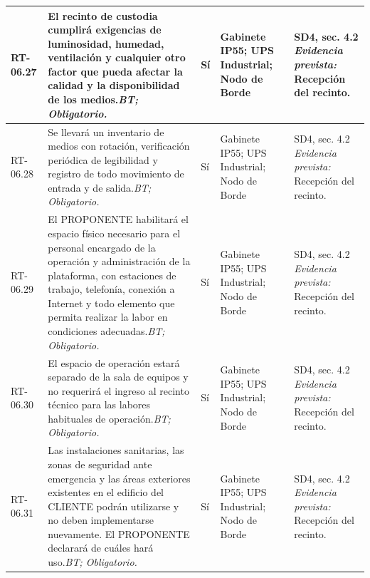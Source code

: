 \begin{paginaHorizontalSynaptix}
\begin{longtable}{|L{0.09\AnchoMatrizTDoce}|L{0.385\AnchoMatrizTDoce}|L{0.065\AnchoMatrizTDoce}|L{0.18\AnchoMatrizTDoce}|L{0.28\AnchoMatrizTDoce}|}
RT-\allowbreak{}06.\allowbreak{}27 &
El recinto de custodia cumplirá exigencias de luminosidad, humedad, ventilación y cualquier otro factor que pueda afectar la calidad y la disponibilidad de los medios.\newline\textit{BT; Obligatorio.} &
Sí &
Gabinete IP55; UPS Industrial; Nodo de Borde &
SD4, sec. 4.2 \newline\textit{Evidencia prevista:} Recepción del recinto. \\ \hline

RT-\allowbreak{}06.\allowbreak{}28 &
Se llevará un inventario de medios con rotación, verificación periódica de legibilidad y registro de todo movimiento de entrada y de salida.\newline\textit{BT; Obligatorio.} &
Sí &
Gabinete IP55; UPS Industrial; Nodo de Borde &
SD4, sec. 4.2 \newline\textit{Evidencia prevista:} Recepción del recinto. \\ \hline

RT-\allowbreak{}06.\allowbreak{}29 &
El PROPONENTE habilitará el espacio físico necesario para el personal encargado de la operación y administración de la plataforma, con estaciones de trabajo, telefonía, conexión a Internet y todo elemento que permita realizar la labor en condiciones adecuadas.\newline\textit{BT; Obligatorio.} &
Sí &
Gabinete IP55; UPS Industrial; Nodo de Borde &
SD4, sec. 4.2 \newline\textit{Evidencia prevista:} Recepción del recinto. \\ \hline

RT-\allowbreak{}06.\allowbreak{}30 &
El espacio de operación estará separado de la sala de equipos y no requerirá el ingreso al recinto técnico para las labores habituales de operación.\newline\textit{BT; Obligatorio.} &
Sí &
Gabinete IP55; UPS Industrial; Nodo de Borde &
SD4, sec. 4.2 \newline\textit{Evidencia prevista:} Recepción del recinto. \\ \hline

RT-\allowbreak{}06.\allowbreak{}31 &
Las instalaciones sanitarias, las zonas de seguridad ante emergencia y las áreas exteriores existentes en el edificio del CLIENTE podrán utilizarse y no deben implementarse nuevamente. El PROPONENTE declarará de cuáles hará uso.\newline\textit{BT; Obligatorio.} &
Sí &
Gabinete IP55; UPS Industrial; Nodo de Borde &
SD4, sec. 4.2 \newline\textit{Evidencia prevista:} Recepción del recinto. \\ \hline


\end{longtable}
\end{paginaHorizontalSynaptix}
